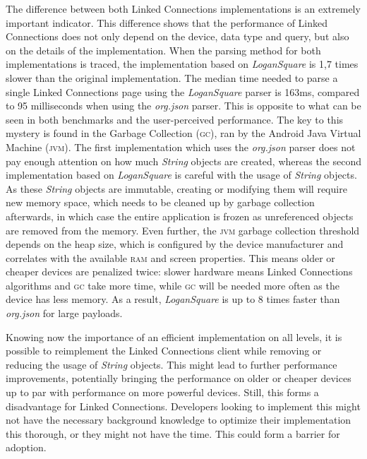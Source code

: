 \documentclass[twocolumn]{phdsymp} %
\begin{document}
The difference between both Linked Connections implementations is an extremely important indicator. This difference shows that the performance of Linked Connections does not only depend on the device, data type and query, but also on the details of the implementation. When the parsing method for both implementations is traced, the implementation based on \emph{LoganSquare} is 1,7 times slower than the original implementation. The median time needed to parse a single Linked Connections page using the \emph{LoganSquare} parser is 163ms, compared to 95 milliseconds when using the \emph{org.json} parser. This is opposite to what can be seen in both benchmarks and the user-perceived performance. The key to this mystery is found in the Garbage Collection (\textsc{gc}), ran by the Android Java Virtual Machine (\textsc{jvm}). The first implementation which uses the \emph{org.json} parser does not pay enough attention on how much \emph{String} objects are created, whereas the second implementation based on \emph{LoganSquare} is careful with the usage of \emph{String} objects. As these \emph{String} objects are immutable, creating or modifying them will require new memory space, which needs to be cleaned up by garbage collection afterwards, in which case the entire application is frozen as unreferenced objects are removed from the memory. Even further, the \textsc{jvm} garbage collection threshold depends on the heap size, which is configured by the device manufacturer and correlates with the available \textsc{ram} and screen properties. This means older or cheaper devices are penalized twice: slower hardware means Linked Connections algorithms and \textsc{gc} take more time, while \textsc{gc} will be needed more often as the device has less memory. As a result, \emph{LoganSquare} is up to 8 times faster than \emph{org.json} for large payloads.

Knowing now the importance of an efficient implementation on all levels, it is possible to reimplement the Linked Connections client while removing or reducing the usage of
\emph{String} objects. This might lead to further performance improvements, potentially bringing the performance on older or cheaper devices up to par with performance on more powerful devices. Still, this forms a disadvantage for Linked Connections. Developers looking to implement this might not have the necessary background knowledge to optimize their implementation this thorough, or they might not have the time. This could form a barrier for adoption.
\end{document}
